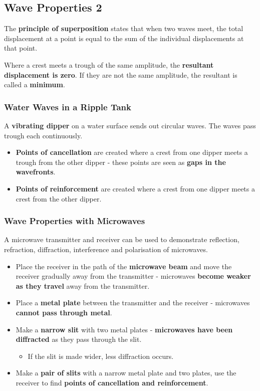 \subsection{Wave Properties 2}

The \textbf{principle of superposition} states that when two waves meet, the total displacement at a point is equal to the sum of the individual displacements at that point.

Where a crest meets a trough of the same amplitude, the \textbf{resultant displacement is zero}. If they are not the same amplitude, the resultant is called a \textbf{minimum}.

\subsubsection*{Water Waves in a Ripple Tank}
A \textbf{vibrating dipper} on a water surface sends out circular waves. The waves pass trough each continuously.
\begin{itemize}
    \item \textbf{Points of cancellation} are created where a crest from one dipper meets a trough from the other dipper - these points are seen as \textbf{gaps in the wavefronts}.
    \item \textbf{Points of reinforcement} are created where a crest from one dipper meets a crest from the other dipper.
\end{itemize}

\subsubsection*{Wave Properties with Microwaves}

A microwave transmitter and receiver can be used to demonstrate reflection, refraction, diffraction, interference and polarisation of microwaves.
\begin{itemize}
    \item Place the receiver in the path of the \textbf{microwave beam} and move the receiver gradually away from the transmitter - microwaves \textbf{become weaker as they travel} away from the transmitter.
    \item Place a \textbf{metal plate} between the transmitter and the receiver - microwaves \textbf{cannot pass through metal}.
    \item Make a \textbf{narrow slit} with two metal plates - \textbf{microwaves have been diffracted} as they pass through the slit.
        \begin{itemize}
            \item If the slit is made wider, less diffraction occurs.
        \end{itemize}
    \item Make a \textbf{pair of slits} with a narrow metal plate and two plates, use the receiver to find \textbf{points of cancellation and reinforcement}.
\end{itemize}
